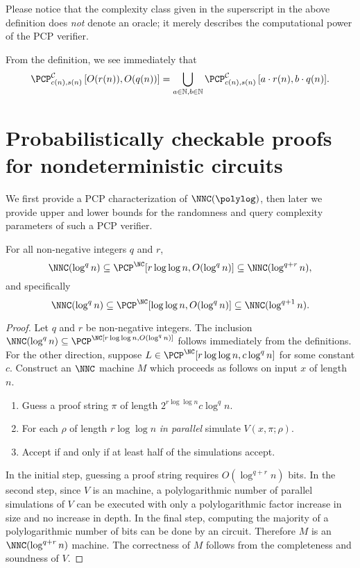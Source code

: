 \documentclass{article}
\newcommand{\PCPcs}[5]{\PCP^{#1}_{#2, #3}\left[#4, #5\right]}
\newcommand{\loglog}{\log\log}
\begin{document}
Please notice that the complexity class given in the superscript in the above definition does \emph{not} denote an oracle; it merely describes the computational power of the PCP verifier.

From the definition, we see immediately that
\begin{equation*}
  \PCPcs{\mathcal{C}}{c(n)}{s(n)}{O(r(n))}{O(q(n))} = \bigcup_{a \in \mathbb{N}, b \in \mathbb{N}}{\PCPcs{\mathcal{C}}{c(n)}{s(n)}{a \cdot r(n)}{b \cdot q(n)}}.
\end{equation*}

\section{Probabilistically checkable proofs for nondeterministic circuits}

We first provide a PCP characterization of $\NNC(\polylog)$, then later we provide upper and lower bounds for the randomness and query complexity parameters of such a PCP verifier.

\begin{theorem}\label{thm:qplusr}
  For all non-negative integers $q$ and $r$,
  \begin{equation*}
    \NNC(\log^q n) \subseteq \PCP^{\NC}[r \loglog n, O(\log^q n)] \subseteq \NNC(\log^{q + r} n),
  \end{equation*}
  and specifically
  \begin{equation*}
    \NNC(\log^q n) \subseteq \PCP^{\NC}[\loglog n, O(\log^q n)] \subseteq \NNC(\log^{q + 1} n).
  \end{equation*}
\end{theorem}
\begin{proof}
  Let $q$ and $r$ be non-negative integers.
  The inclusion $\NNC(\log^q n) \subseteq \PCP^\NC[r \loglog n, O(\log^q n)]$ follows immediately from the definitions.
  For the other direction, suppose $L \in \PCP^{\NC}[r \loglog n, c \log^q n]$ for some constant $c$.
  Construct an $\NNC$ machine $M$ which proceeds as follows on input $x$ of length $n$.
  \begin{enumerate}
  \item Guess a proof string $\pi$ of length $2^{r \loglog n} c \log^q n$.
  \item For each $\rho$ of length $r \loglog n$ \emph{in parallel} simulate $V(x, \pi; \rho)$.
  \item Accept if and only if at least half of the simulations accept.
  \end{enumerate}
In the initial step, guessing a proof string requires $O(\log^{q + r} n)$ bits.
In the second step, since $V$ is an \NC{} machine, a polylogarithmic number of parallel simulations of $V$ can be executed with only a polylogarithmic factor increase in size and no increase in depth.
In the final step, computing the majority of a polylogarithmic number of bits can be done by an \NC{} circuit.
Therefore $M$ is an $\NNC(\log^{q + r} n)$ machine.
The correctness of $M$ follows from the completeness and soundness of $V$.
\end{proof}
\end{document}

